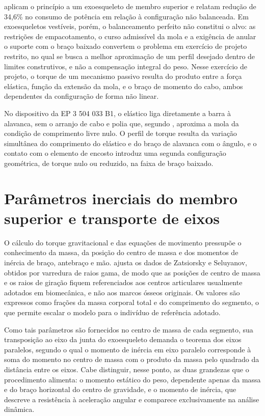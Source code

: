 \textcite{wu2016} aplicam o princípio a um exoesqueleto de membro superior e relatam redução de 34,6\% no consumo de potência em relação à configuração não balanceada. Em exoesqueletos vestíveis, porém, o balanceamento perfeito não constitui o alvo: as restrições de empacotamento, o curso admissível da mola e a exigência de anular o suporte com o braço baixado convertem o problema em exercício de projeto restrito, no qual se busca a melhor aproximação de um perfil desejado dentro de limites construtivos, e não a compensação integral do peso. Nesse exercício de projeto, o torque de um mecanismo passivo resulta do produto entre a força elástica, função da extensão da mola, e o braço de momento do cabo, ambos dependentes da configuração de forma não linear.

No dispositivo da EP 3 504 033 B1, o elástico liga diretamente a barra à alavanca, sem o arranjo de cabo e polia que, segundo \textcite{herder2001}, aproxima a mola da condição de comprimento livre nulo. O perfil de torque resulta da variação simultânea do comprimento do elástico e do braço de alavanca com o ângulo, e o contato com o elemento de encosto introduz uma segunda configuração geométrica, de torque nulo ou reduzido, na faixa de braço baixado.

\section{Parâmetros inerciais do membro superior e transporte de eixos}\label{sec:2.9}

O cálculo do torque gravitacional e das equações de movimento pressupõe o conhecimento da massa, da posição do centro de massa e dos momentos de inércia de braço, antebraço e mão. \Textcite{deleva1996} ajusta os dados de Zatsiorsky e Seluyanov, obtidos por varredura de raios gama, de modo que as posições de centro de massa e os raios de giração fiquem referenciados aos centros articulares usualmente adotados em biomecânica, e não aos marcos ósseos originais. Os valores são expressos como frações da massa corporal total e do comprimento do segmento, o que permite escalar o modelo para o indivíduo de referência adotado.

Como tais parâmetros são fornecidos no centro de massa de cada segmento, sua transposição ao eixo da junta do exoesqueleto demanda o teorema dos eixos paralelos, segundo o qual o momento de inércia em eixo paralelo corresponde à soma do momento no centro de massa com o produto da massa pelo quadrado da distância entre os eixos. Cabe distinguir, nesse ponto, as duas grandezas que o procedimento alimenta: o momento estático do peso, dependente apenas da massa e do braço horizontal do centro de gravidade, e o momento de inércia, que descreve a resistência à aceleração angular e comparece exclusivamente na análise dinâmica.

